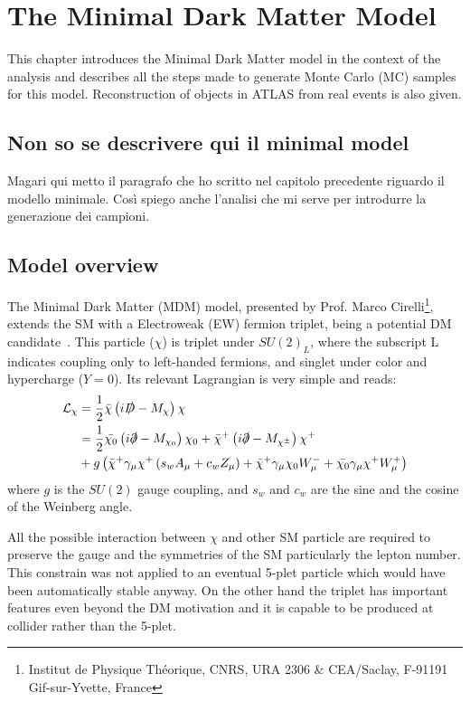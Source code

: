 \chapter{The Minimal Dark Matter Model}

\lettrine{T}{}his chapter introduces the Minimal Dark Matter model in the context of the \mph analysis and describes all the steps made to generate Monte Carlo (MC) samples for this model. Reconstruction of objects in ATLAS from real events is also given.

\section{Non so se descrivere qui il minimal model}
Magari qui metto il paragrafo che ho scritto nel capitolo precedente riguardo il modello minimale. Cos\`i  spiego anche l'analisi \mph che mi serve per introdurre la generazione dei campioni.

\section{Model overview}
The Minimal Dark Matter (MDM) model, presented by Prof. Marco Cirelli\footnote{Institut de Physique Th\'eorique, CNRS, URA 2306 \& CEA/Saclay, F-91191 Gif-sur-Yvette, France}, extends the SM with a Electroweak (EW) fermion triplet, being a potential DM candidate~\cite{Cirelli:paper}. This particle ($\chi$) is triplet under $SU(2)_L$, where the subscript L indicates coupling only to left-handed fermions, and singlet under color and hypercharge ($Y=0$). Its relevant Lagrangian is very simple and reads:
\begin{equation}
\begin{split}
\mathcal{L}_\chi&=\frac{1}{2}\bar{\chi}\left(i\slashed{D}-M_\chi\right)\chi \\
			&= \frac{1}{2}\bar{\chi_0}\left(i\slashed{\partial}-M_{\chi_0}\right)\chi_0+\bar{\chi}^+\left(i\slashed{\partial}-M_{\chi^\pm}\right)\chi^+ \\
			&+ g \left(\bar{\chi}^+\gamma_\mu\chi^+\left(s_w A_\mu + c_w Z_\mu \right) +\bar{\chi}^+ \gamma_\mu\chi_0W^-_\mu + \bar{\chi_0}\gamma_\mu\chi^+W^+_\mu \right)
\end{split}
\end{equation}
where $g$ is the $SU(2)$ gauge coupling, and $s_w$ and $c_w$ are the sine and the cosine of the Weinberg angle.

All the possible interaction between $\chi$ and other SM particle are required to preserve the gauge and the symmetries of the SM particularly the lepton number. This constrain was not applied to an eventual 5-plet particle which would have been automatically stable anyway. On the other hand the triplet has important features even beyond the DM motivation and it is capable to be produced at collider rather than the 5-plet.

